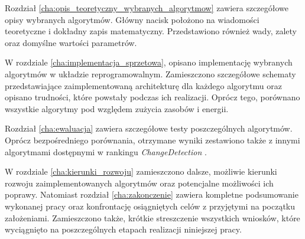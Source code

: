 Rozdział \ref{cha:opis_teoretyczny_wybranych_algorytmow} zawiera szczegółowe opisy wybranych algorytmów. 
Główny nacisk położono na wiadomości teoretyczne i dokładny zapis matematyczny. 
Przedstawiono również wady, zalety oraz domyślne wartości parametrów.

W rozdziale \ref{cha:implementacja_sprzetowa}, opisano implementację wybranych algorytmów w układzie reprogramowalnym. 
Zamieszczono szczegółowe schematy przedstawiające zaimplementowaną architekturę dla każdego algorytmu oraz opisano trudności, które powstały podczas ich realizacji. 
Oprócz tego, porównano wszystkie algorytmy pod względem zużycia zasobów i energii.

Rozdział \ref{cha:ewaluacja} zawiera szczegółowe testy poszczególnych algorytmów. 
Oprócz bezpośredniego porównania, otrzymane wyniki zestawiono także z innymi algorytmami dostępnymi w rankingu \textit{ChangeDetection} \cite{change_detection_web}.

W rozdziale \ref{cha:kierunki_rozwoju} zamieszczono dalsze, możliwie kierunki rozwoju zaimplementowanych algorytmów oraz potencjalne możliwości ich poprawy. 
Natomiast rozdział \ref{cha:zakonczenie} zawiera kompletne podsumowanie wykonanej pracy oraz konfrontację osiągniętych celów z przyjętymi na początku założeniami. 
Zamieszczono także, krótkie streszczenie wszystkich wniosków, które wyciągnięto na poszczególnych etapach realizacji niniejszej pracy.
